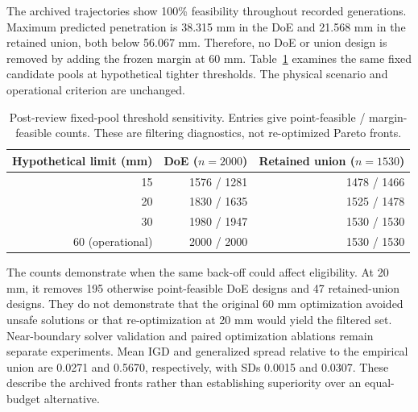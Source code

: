 \documentclass[12pt]{elsarticle}
\begin{document}
The archived trajectories show 100\% feasibility throughout recorded generations. Maximum predicted penetration is 38.315 mm in the DoE and 21.568 mm in the retained union, both below 56.067 mm. Therefore, no DoE or union design is removed by adding the frozen margin at 60 mm. Table~\ref{tab:threshold} examines the same fixed candidate pools at hypothetical tighter thresholds. The physical scenario and operational criterion are unchanged.
\begin{table}[H]\centering\small
\caption{Post-review fixed-pool threshold sensitivity. Entries give point-feasible / margin-feasible counts. These are filtering diagnostics, not re-optimized Pareto fronts.}\label{tab:threshold}
\begin{tabular}{@{}rrr@{}}\toprule
Hypothetical limit (mm)&DoE ($n=2000$)&Retained union ($n=1530$)\\\midrule
15&1576 / 1281&1478 / 1466\\
20&1830 / 1635&1525 / 1478\\
30&1980 / 1947&1530 / 1530\\
60 (operational)&2000 / 2000&1530 / 1530\\\bottomrule
\end{tabular}\end{table}
The counts demonstrate when the same back-off could affect eligibility. At 20 mm, it removes 195 otherwise point-feasible DoE designs and 47 retained-union designs. They do not demonstrate that the original 60 mm optimization avoided unsafe solutions or that re-optimization at 20 mm would yield the filtered set. Near-boundary solver validation and paired optimization ablations remain separate experiments. Mean IGD and generalized spread relative to the empirical union are 0.0271 and 0.5670, respectively, with SDs 0.0015 and 0.0307. These describe the archived fronts rather than establishing superiority over an equal-budget alternative.
\end{document}
